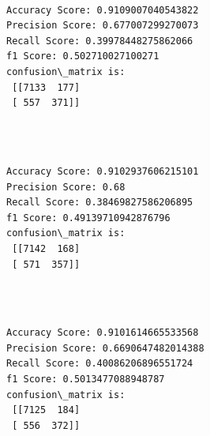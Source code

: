 \documentclass[11pt]{article}
\begin{document}
   

    \begin{center}
    \end{center}
    { \hspace*{\fill} \\}
 

    \begin{Verbatim}[commandchars=\\\{\}]
Accuracy Score: 0.9109007040543822
Precision Score: 0.677007299270073
Recall Score: 0.39978448275862066
f1 Score: 0.502710027100271
confusion\_matrix is: 
 [[7133  177]
 [ 557  371]] 


    \end{Verbatim}

   

    \begin{center}
    \end{center}
    { \hspace*{\fill} \\}
    
   

    \begin{Verbatim}[commandchars=\\\{\}]
Accuracy Score: 0.9102937606215101
Precision Score: 0.68
Recall Score: 0.38469827586206895
f1 Score: 0.49139710942876796
confusion\_matrix is: 
 [[7142  168]
 [ 571  357]] 


    \end{Verbatim}

    \begin{center}
    \end{center}
    { \hspace*{\fill} \\}
    
  

    \begin{Verbatim}[commandchars=\\\{\}]
Accuracy Score: 0.9101614665533568
Precision Score: 0.6690647482014388
Recall Score: 0.40086206896551724
f1 Score: 0.5013477088948787
confusion\_matrix is: 
 [[7125  184]
 [ 556  372]] 


    \end{Verbatim}

 

    \begin{center}
    \end{center}
    { \hspace*{\fill} \\}
    
\end{document}
